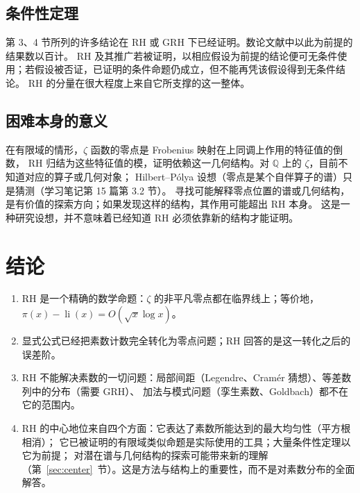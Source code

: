 \documentclass[11pt]{article}
\newcommand{\li}{\operatorname{li}}
\begin{document}
\subsection{条件性定理}
第 3、4 节所列的许多结论在 RH 或 GRH 下已经证明。数论文献中以此为前提的结果数以百计。
RH 及其推广若被证明，以相应假设为前提的结论便可无条件使用；若假设被否证，已证明的条件命题仍成立，但不能再凭该假设得到无条件结论。
RH 的分量在很大程度上来自它所支撑的这一整体。

\subsection{困难本身的意义}
在有限域的情形，$\zeta$ 函数的零点是 Frobenius 映射在上同调上作用的特征值的倒数，
RH 归结为这些特征值的模，证明依赖这一几何结构。对 $\mathbb Q$ 上的 $\zeta$，目前不知道对应的算子或几何对象；
Hilbert--Pólya 设想（零点是某个自伴算子的谱）只是猜测（学习笔记第 15 篇第 3.2 节）。
寻找可能解释零点位置的谱或几何结构，是有价值的探索方向；如果发现这样的结构，其作用可能超出 RH 本身。
这是一种研究设想，并不意味着已经知道 RH 必须依靠新的结构才能证明。

\section{结论}
\begin{enumerate}
 \item RH 是一个精确的数学命题：$\zeta$ 的非平凡零点都在临界线上；等价地，$\pi(x)-\li(x)=O(\sqrt x\log x)$。
 \item 显式公式已经把素数计数完全转化为零点问题；RH 回答的是这一转化之后的误差阶。
 \item RH 不能解决素数的一切问题：局部间距（Legendre、Cramér 猜想）、等差数列中的分布（需要 GRH）、
 加法与模式问题（孪生素数、Goldbach）都不在它的范围内。
 \item RH 的中心地位来自四个方面：它表达了素数所能达到的最大均匀性（平方根相消）；
 它已被证明的有限域类似命题是实际使用的工具；大量条件性定理以它为前提；
 对潜在谱与几何结构的探索可能带来新的理解（第~\ref{sec:center}~节）。这是方法与结构上的重要性，而不是对素数分布的全面解答。
\end{enumerate}
\end{document}
